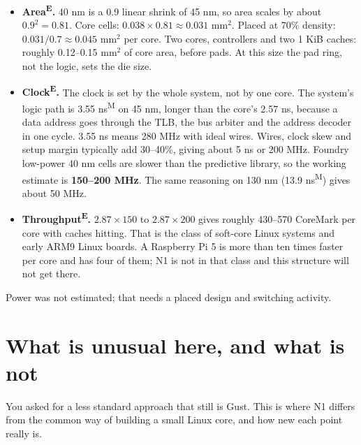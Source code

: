 \documentclass[10pt,a4paper]{article}
\newcommand{\meas}{\textsuperscript{M}}
\newcommand{\est}{\textsuperscript{E}}
\begin{document}
\begin{itemize}
\item \textbf{Area\est.} 40 nm is a 0.9 linear shrink of 45 nm, so area scales by about $0.9^2 = 0.81$.
Core cells: $0.038 \times 0.81 \approx 0.031$ mm$^2$. Placed at 70\% density:
$0.031 / 0.7 \approx 0.045$ mm$^2$ per core. Two cores, controllers and two 1 KiB caches: roughly
0.12--0.15 mm$^2$ of core area, before pads. At this size the pad ring, not the logic, sets the die size.
\item \textbf{Clock\est.} The clock is set by the whole system, not by one core. The system's logic
path is 3.55 ns\meas{} on 45 nm, longer than the core's 2.57 ns, because a data address goes through the TLB,
the bus arbiter and the address decoder in one cycle. 3.55 ns means 280 MHz with ideal wires. Wires, clock
skew and setup margin typically add 30--40\%, giving about 5 ns or 200 MHz. Foundry low-power 40 nm cells
are slower than the predictive library, so the working estimate is \textbf{150--200 MHz}. The same
reasoning on 130 nm (13.9 ns\meas) gives about 50 MHz.
\item \textbf{Throughput\est.} $2.87 \times 150$ to $2.87 \times 200$ gives roughly 430--570 CoreMark
per core with caches hitting. That is the class of soft-core Linux systems and early ARM9 Linux boards.
A Raspberry Pi 5 is more than ten times faster per core and has four of them; N1 is not in that class
and this structure will not get there.
\end{itemize}
Power was not estimated; that needs a placed design and switching activity.

\section{What is unusual here, and what is not}
You asked for a less standard approach that still is Gust. This is where N1 differs from the common
way of building a small Linux core, and how new each point really is.
\end{document}
